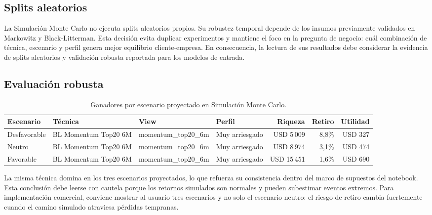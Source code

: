 \subsection*{Splits aleatorios}

La Simulaci\'on Monte Carlo no ejecuta splits aleatorios propios. Su robustez
temporal depende de los insumos previamente validados en Markowitz y
Black-Litterman. Esta decisi\'on evita duplicar experimentos y mantiene el foco
en la pregunta de negocio: cu\'al combinaci\'on de t\'ecnica, escenario y perfil
genera mejor equilibrio cliente-empresa. En consecuencia, la lectura de sus
resultados debe considerar la evidencia de splits aleatorios y validaci\'on
robusta reportada para los modelos de entrada.

\subsection*{Evaluaci\'on robusta}

\begin{table}[H]
\centering
\caption{Ganadores por escenario proyectado en Simulaci\'on Monte Carlo.}
\label{tab:anexo4_mc_robusta}
\small
\begin{adjustbox}{max width=\textwidth}
\begin{tabular}{llllrrr}
\toprule
Escenario & T\'ecnica & View & Perfil & Riqueza & Retiro & Utilidad \\
\midrule
Desfavorable & BL Momentum Top20 6M & momentum\_top20\_6m & Muy arriesgado & USD 5\,009 & 8,8\% & USD 327 \\
Neutro & BL Momentum Top20 6M & momentum\_top20\_6m & Muy arriesgado & USD 8\,974 & 3,1\% & USD 474 \\
Favorable & BL Momentum Top20 6M & momentum\_top20\_6m & Muy arriesgado & USD 15\,451 & 1,6\% & USD 690 \\
\bottomrule
\end{tabular}
\end{adjustbox}
\end{table}

La misma t\'ecnica domina en los tres escenarios proyectados, lo que refuerza su
consistencia dentro del marco de supuestos del notebook. Esta conclusi\'on debe
leerse con cautela porque los retornos simulados son normales y pueden
subestimar eventos extremos. Para implementaci\'on comercial, conviene mostrar al
usuario tres escenarios y no solo el escenario neutro: el riesgo de retiro cambia
fuertemente cuando el camino simulado atraviesa p\'erdidas tempranas.

